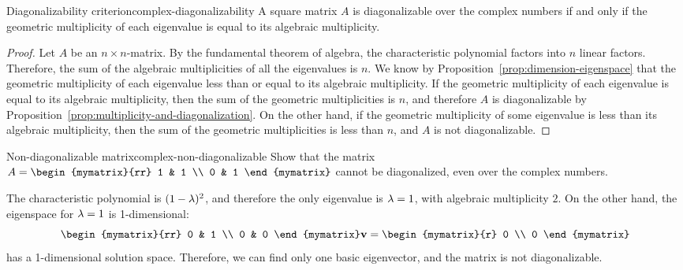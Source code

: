 \begin{proposition}{Diagonalizability criterion}{complex-diagonalizability}
  A square matrix $A$ is diagonalizable over the complex numbers if
  and only if the geometric multiplicity of each eigenvalue is equal
  to its algebraic multiplicity.
\end{proposition}

\begin{proof}
  Let $A$ be an $n\times n$-matrix. By the fundamental theorem of
  algebra, the characteristic polynomial factors into $n$ linear
  factors. Therefore, the sum of the algebraic multiplicities of all
  the eigenvalues is $n$. We know by
  Proposition~\ref{prop:dimension-eigenspace} that the geometric
  multiplicity of each eigenvalue less than or equal to its algebraic
  multiplicity. If the geometric multiplicity of each eigenvalue is
  equal to its algebraic multiplicity, then the sum of the geometric
  multiplicities is $n$, and therefore $A$ is diagonalizable by
  Proposition~\ref{prop:multiplicity-and-diagonalization}. On the
  other hand, if the geometric multiplicity of some eigenvalue is less
  than its algebraic multiplicity, then the sum of the geometric
  multiplicities is less than $n$, and $A$ is not diagonalizable.
\end{proof}

\begin{example}{Non-diagonalizable matrix}{complex-non-diagonalizable}
  Show that the matrix $A =
    \begin{mymatrix}{rr}
      1 & 1 \\
      0 & 1
    \end{mymatrix}$ cannot be diagonalized, even over the complex numbers.
\end{example}

\begin{solution}
  The characteristic polynomial is $(1-\lambda)^2$, and therefore
  the only eigenvalue is $\lambda=1$, with algebraic multiplicity
  $2$. On the other hand, the eigenspace for $\lambda=1$ is
  1-dimensional:
  \begin{equation*}
    \begin{mymatrix}{rr}
      0 & 1 \\
      0 & 0
    \end{mymatrix}
    \vect{v}
    = \begin{mymatrix}{r} 0 \\ 0 \end{mymatrix}
  \end{equation*}
  has a 1-dimensional solution space. Therefore, we can find only one
  basic eigenvector, and the matrix is not diagonalizable.
\end{solution}

